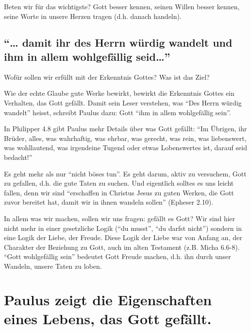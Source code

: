 \documentclass[
  12pt,
]{krantz}
\makeatletter
\newenvironment{kframe}{%
\medskip{}
\setlength{\fboxsep}{.8em}
 \def\at@end@of@kframe{}%
 \ifinner\ifhmode%
  \def\at@end@of@kframe{\end{minipage}}%
  \begin{minipage}{\columnwidth}%
 \fi\fi%
 \def\FrameCommand##1{\hskip\@totalleftmargin \hskip-\fboxsep
 \colorbox{shadecolor}{##1}\hskip-\fboxsep
     \hskip-\linewidth \hskip-\@totalleftmargin \hskip\columnwidth}%
 \MakeFramed {\advance\hsize-\width
   \@totalleftmargin\z@ \linewidth\hsize
   \@setminipage}}%
 {\par\unskip\endMakeFramed%
 \at@end@of@kframe}
\newenvironment{rmdblock}[1]
  {
  \begin{itemize}
  \renewcommand{\labelitemi}{
    \raisebox{-.7\height}[0pt][0pt]{
      {\setkeys{Gin}{width=3em,keepaspectratio}\texttt{[image: img/\#1]}}
    }
  }
  \setlength{\fboxsep}{1em}
  \begin{kframe}
  \item
  }
  {
  \end{kframe}
  \end{itemize}
  }
\newenvironment{rmdquestion}
  {\begin{rmdblock}{question}}
  {\end{rmdblock}}
\makeatother
\begin{document}
\begin{rmdquestion}
Beten wir für das wichtigste? Gott besser kennen, seinen Willen besser
kennen, seine Worte in unsere Herzen tragen (d.h. danach handeln).
\end{rmdquestion}

\hypertarget{damit-ihr-des-herrn-wuxfcrdig-wandelt-und-ihm-in-allem-wohlgefuxe4llig-seid}{%
\subsection{\texorpdfstring{``\ldots{} damit ihr des Herrn würdig wandelt und ihm in allem wohlgefällig seid\ldots{}''}{``\ldots{} damit ihr des Herrn würdig wandelt und ihm in allem wohlgefällig seid\ldots''}}\label{damit-ihr-des-herrn-wuxfcrdig-wandelt-und-ihm-in-allem-wohlgefuxe4llig-seid}}

Wofür sollen wir erfüllt mit der Erkenntnis Gottes? Was ist das Ziel?

Wie der echte Glaube gute Werke bewirkt, bewirkt die Erkenntnis Gottes ein Verhalten, das Gott gefällt. Damit sein Leser verstehen, was ``Des Herrn würdig wandelt'' heisst, schreibt Paulus dazu: Gott ``ihm in allem wohlgefällig sein''.

In Philipper 4.8 gibt Paulus mehr Details über was Gott gefällt:
``Im Übrigen, ihr Brüder, alles, was wahrhaftig, was ehrbar, was gerecht, was rein, was liebenswert, was wohllautend, was irgendeine Tugend oder etwas Lobenswertes ist, darauf seid bedacht!''

Es geht mehr als nur ``nicht böses tun''. Es geht darum, aktiv zu versuchem, Gott zu gefallen, d.h. die gute Taten zu suchen. Und eigentlich solltes es uns leicht fallen, denn wir sind ``erschaffen in Christus Jesus zu guten Werken, die Gott zuvor bereitet hat, damit wir in ihnen wandeln sollen'' (Epheser 2.10).

In allem was wir machen, sollen wir uns fragen: gefällt es Gott? Wir sind hier nicht mehr in einer gesetzliche Logik (``du musst'', ``du darfst nicht'') sondern in eine Logik der Liebe, der Freude. Diese Logik der Liebe war von Anfang an, der Charakter der Beziehung zu Gott, auch im alten Testament (z.B. Micha 6.6-8). ``Gott wohlgefällig sein'' bedeutet Gott Freude machen, d.h. ihn durch unser Wandeln, unsere Taten zu loben.

\hypertarget{paulus-zeigt-die-eigenschaften-eines-lebens-das-gott-gefuxe4llt.}{%
\section{Paulus zeigt die Eigenschaften eines Lebens, das Gott gefällt.}\label{paulus-zeigt-die-eigenschaften-eines-lebens-das-gott-gefuxe4llt.}}
\end{document}
